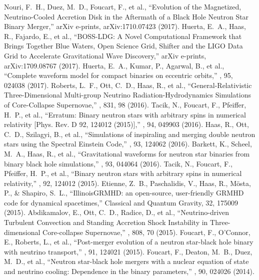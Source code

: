  Nouri, F.~H., Duez, M.~D., Foucart, F., et al., ``Evolution of the Magnetized, Neutrino-Cooled Accretion Disk in the Aftermath of a Black Hole Neutron Star Binary Merger,'' arXiv e-prints, arXiv:1710.07423 (2017).
 Huerta, E.~A., Haas, R., Fajardo, E., et al., ``BOSS-LDG: A Novel Computational Framework that Brings Together Blue Waters, Open Science Grid, Shifter and the LIGO Data Grid to Accelerate Gravitational Wave Discovery,'' arXiv e-prints, arXiv:1709.08767 (2017).
 Huerta, E.~A., Kumar, P., Agarwal, B., et al., ``Complete waveform model for compact binaries on eccentric orbits,'' \prd, 95, 024038 (2017).
 Roberts, L.~F., Ott, C.~D., Haas, R., et al., ``General-Relativistic Three-Dimensional Multi-group Neutrino Radiation-Hydrodynamics Simulations of Core-Collapse Supernovae,'' \apj, 831, 98 (2016).
 Tacik, N., Foucart, F., Pfeiffer, H.~P., et al., ``Erratum: Binary neutron stars with arbitrary spins in numerical relativity [Phys. Rev. D 92, 124012 (2015)],'' \prd, 94, 049903 (2016).
 Haas, R., Ott, C.~D., Szilagyi, B., et al., ``Simulations of inspiraling and merging double neutron stars using the Spectral Einstein Code,'' \prd, 93, 124062 (2016).
 Barkett, K., Scheel, M.~A., Haas, R., et al., ``Gravitational waveforms for neutron star binaries from binary black hole simulations,'' \prd, 93, 044064 (2016).
 Tacik, N., Foucart, F., Pfeiffer, H.~P., et al., ``Binary neutron stars with arbitrary spins in numerical relativity,'' \prd, 92, 124012 (2015).
 Etienne, Z.~B., Paschalidis, V., Haas, R., M{\"o}sta, P., \& Shapiro, S.~L., ``IllinoisGRMHD: an open-source, user-friendly GRMHD code for dynamical spacetimes,'' Classical and Quantum Gravity, 32, 175009 (2015).
 Abdikamalov, E., Ott, C.~D., Radice, D., et al., ``Neutrino-driven Turbulent Convection and Standing Accretion Shock Instability in Three-dimensional Core-collapse Supernovae,'' \apj, 808, 70 (2015).
 Foucart, F., O'Connor, E., Roberts, L., et al., ``Post-merger evolution of a neutron star-black hole binary with neutrino transport,'' \prd, 91, 124021 (2015).
 Foucart, F., Deaton, M.~B., Duez, M.~D., et al., ``Neutron star-black hole mergers with a nuclear equation of state and neutrino cooling: Dependence in the binary parameters,'' \prd, 90, 024026 (2014).
